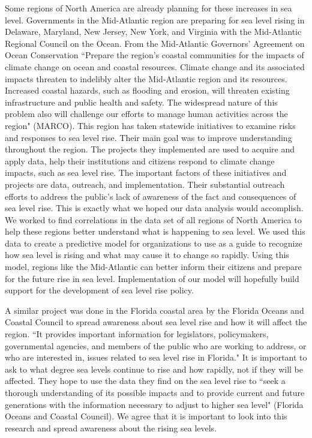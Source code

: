 \documentclass[12pt]{report}
\begin{document}
\par Some regions of North America are already planning for these increases in sea level. Governments in the Mid-Atlantic region are preparing for sea level rising in Delaware, Maryland, New Jersey, New York, and Virginia with the Mid-Atlantic Regional Council on the Ocean. From the Mid‐Atlantic Governors' Agreement on Ocean Conservation \textquotedblleft Prepare the region’s coastal communities for the impacts of climate change on ocean and coastal resources. Climate change and its associated impacts threaten to indelibly alter the Mid‐Atlantic region and its resources. Increased coastal hazards, such as flooding and erosion, will threaten existing infrastructure and public health and safety. The widespread nature of this problem also will challenge our efforts to manage human activities across the region" (MARCO). This region has taken statewide initiatives to examine risks and responses to sea level rise. Their main goal was to improve understanding throughout the region. The projects they implemented are used to acquire and apply data, help their institutions and citizens respond to climate change impacts, such as sea level rise. The important factors of these initiatives and projects are data, outreach, and implementation. Their substantial outreach efforts to address the public’s lack of awareness of the fact and consequences of sea level rise. This is exactly what we hoped our data analysis would accomplish. We worked to find correlations in the data set of all regions of North America to help these regions better understand what is happening to sea level. We used this data to create a predictive model for organizations to use as a guide to recognize how sea level is rising and what may cause it to change so rapidly. Using this model, regions like the Mid-Atlantic can better inform their citizens and prepare for the future rise in sea level. Implementation of our model will hopefully build support for the development of sea level rise policy. 
\par A similar project was done in the Florida coastal area by the Florida Oceans and Coastal Council to spread awareness about sea level rise and how it will affect the region. \textquotedblleft It provides important information for legislators, policymakers, governmental agencies, and members of the public who are working to address, or who are interested in, issues related to sea level rise in Florida." It is important to ask to what degree sea levels continue to rise and how rapidly, not if they will be affected. They hope to use the data they find on the sea level rise to \textquotedblleft seek a thorough understanding of its possible impacts and to provide current and future generations with the information necessary to adjust to higher sea level" (Florida Oceans and Coastal Council). We agree that it is important to look into this research and spread awareness about the rising sea levels. 
\end{document}
